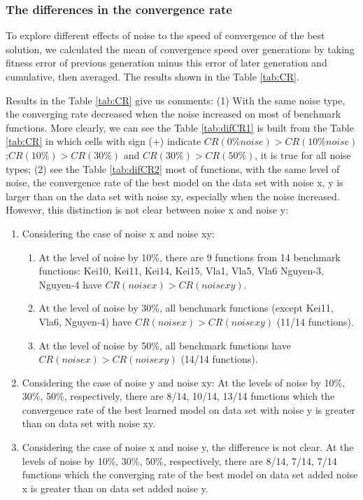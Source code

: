 \subsubsection {The differences in the convergence rate}
\label{AnaDiffCR}
To explore different effects of noise to the speed of convergence of the best solution, we calculated the mean of convergence speed over generations by taking fitness error of previous generation minus this error of later generation and cumulative, then averaged. The results shown in the Table \ref{tab:CR}. \par
Results in the Table \ref{tab:CR} give us comments: (1) With the same noise type, the converging rate decreased when the noise increased on most of benchmark functions. More clearly, we can see the Table \ref{tab:difCR1} is built from the Table \ref{tab:CR} in which cells with sign (+) indicate $CR(0\% noise) > CR(10\% noise)$ ;$ CR(10\%) > CR(30\%)$ and $ CR(30\%) > CR(50\%)$, it is true for all noise types; (2) see the Table \ref{tab:difCR2} most of functions, with the same level of noise, the convergence rate of the best model on the data set with noise x, y is larger than on the data set with noise xy, especially when the noise increased. However, this distinction is not clear between noise x and noise y:
\begin{enumerate}
\item Considering the case of noise x and noise xy:
\begin{enumerate}
\item At the level of noise by 10\%, there are 9 functions from 14 benchmark functions: Kei10, Kei11, Kei14, Kei15, Vla1, Vla5, Vla6 Nguyen-3, Nguyen-4 have $CR(noise x) > CR(noise xy)$.
\item At the level of noise by 30\%, all benchmark  functions  (except Kei11, Vla6, Nguyen-4) have $CR(noise x) > CR(noise xy)$ (11/14 functions).
\item At the level of noise by 50\%, all benchmark  functions have $ CR(noise x) > CR(noise xy)$ (14/14 functions).
\end{enumerate}
\item Considering the case of noise y and noise xy: At the levels of noise by 10\%, 30\%, 50\%, respectively, there are 8/14, 10/14, 13/14 functions which the convergence rate of the best learned model on data set with noise y is greater than on data set with noise xy.
\item Considering the case of noise x and noise y, the difference is not clear. At the levels of noise by 10\%, 30\%, 50\%, respectively, there are 8/14, 7/14, 7/14 functions which the converging rate of the best model on data set added noise x is greater than on data set added noise y.
\end{enumerate} \par
